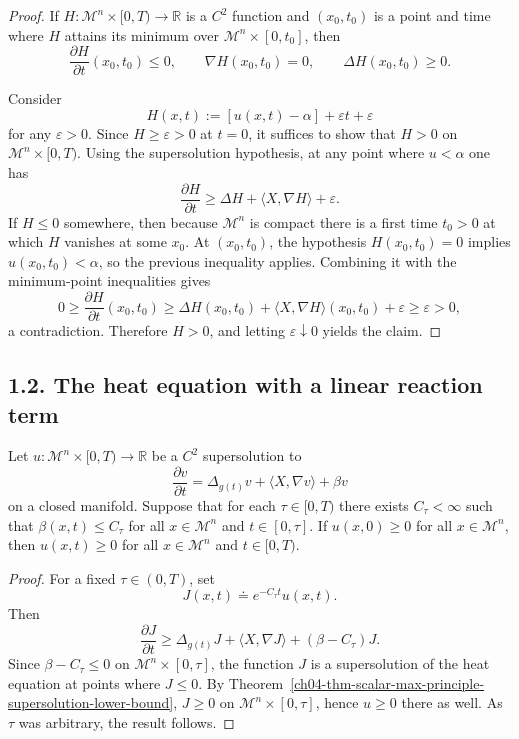 \begin{proof}
\sketch If \(H : \mathcal M^n \times [0,T) \to \mathbb R\) is a \(C^2\) function and \((x_0,t_0)\) is a point and time where \(H\) attains its minimum over \(\mathcal M^n \times [0,t_0]\), then
\[
\frac{\partial H}{\partial t}(x_0,t_0) \le 0,\qquad \nabla H(x_0,t_0)=0,\qquad \Delta H(x_0,t_0)\ge 0.
\]

Consider
\[
H(x,t) := [u(x,t)-\alpha]+\varepsilon t+\varepsilon
\]
for any \(\varepsilon>0\). Since \(H\ge \varepsilon>0\) at \(t=0\), it suffices to show that \(H>0\) on \(\mathcal M^n \times [0,T)\). Using the supersolution hypothesis, at any point where \(u<\alpha\) one has
\[
\frac{\partial H}{\partial t}\ge \Delta H + \langle X,\nabla H\rangle+\varepsilon.
\]
If \(H\le 0\) somewhere, then because \(\mathcal M^n\) is compact there is a first time \(t_0>0\) at which \(H\) vanishes at some \(x_0\). At \((x_0,t_0)\), the hypothesis \(H(x_0,t_0)=0\) implies \(u(x_0,t_0)<\alpha\), so the previous inequality applies. Combining it with the minimum-point inequalities gives
\[
0\ge \frac{\partial H}{\partial t}(x_0,t_0)\ge \Delta H(x_0,t_0)+\langle X,\nabla H\rangle(x_0,t_0)+\varepsilon\ge \varepsilon>0,
\]
a contradiction. Therefore \(H>0\), and letting \(\varepsilon \downarrow 0\) yields the claim.
\end{proof}

\subsection*{1.2. The heat equation with a linear reaction term}

\begin{proposition}
\label{ch04-prop-scalar-max-principle-linear-reaction}
Let \(u : \mathcal M^n \times [0,T) \to \mathbb R\) be a \(C^2\) supersolution to
\[
\frac{\partial v}{\partial t} = \Delta_{g(t)} v + \langle X, \nabla v \rangle + \beta v
\]
on a closed manifold. Suppose that for each \(\tau \in [0,T)\) there exists \(C_\tau<\infty\) such that \(\beta(x,t)\le C_\tau\) for all \(x \in \mathcal M^n\) and \(t \in [0,\tau]\). If \(u(x,0)\ge 0\) for all \(x \in \mathcal M^n\), then \(u(x,t)\ge 0\) for all \(x \in \mathcal M^n\) and \(t \in [0,T)\).
\end{proposition}

\begin{proof}
\sketch For a fixed \(\tau\in(0,T)\), set
\[
J(x,t)\doteq e^{-C_\tau t}u(x,t).
\]
Then
\[
\frac{\partial J}{\partial t}\ge \Delta_{g(t)}J+\langle X,\nabla J\rangle+(\beta-C_\tau)J.
\]
Since \(\beta-C_\tau\le 0\) on \(\mathcal M^n\times[0,\tau]\), the function \(J\) is a supersolution of the heat equation at points where \(J\le 0\). By Theorem~\ref{ch04-thm-scalar-max-principle-supersolution-lower-bound}, \(J\ge 0\) on \(\mathcal M^n\times[0,\tau]\), hence \(u\ge 0\) there as well. As \(\tau\) was arbitrary, the result follows.
\end{proof}

